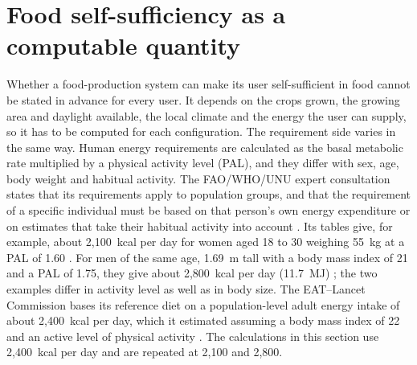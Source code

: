 \section{Food self-sufficiency as a computable quantity}\label{sec:nutrition-analysis}

Whether a food-production system can make its user self-sufficient in food cannot be stated in advance for every user. It depends on the crops grown, the growing area and daylight available, the local climate and the energy the user can supply, so it has to be computed for each configuration. The requirement side varies in the same way. Human energy requirements are calculated as the basal metabolic rate multiplied by a physical activity level (PAL), and they differ with sex, age, body weight and habitual activity. The FAO/WHO/UNU expert consultation states that its requirements apply to population groups, and that the requirement of a specific individual must be based on that person's own energy expenditure or on estimates that take their habitual activity into account \cite[Section~5.4.1, p.~40]{faowhounu2004energy}. Its tables give, for example, about 2{,}100~kcal per day for women aged 18 to 30 weighing 55~kg at a PAL of 1.60 \cite[Table~5.7, p.~44]{faowhounu2004energy}. For men of the same age, 1.69~m tall with a body mass index of 21 and a PAL of 1.75, they give about 2{,}800~kcal per day (11.7~MJ) \cite[Section~5.4.2, p.~40; Table~5.4, p.~41]{faowhounu2004energy}; the two examples differ in activity level as well as in body size. The EAT--Lancet Commission bases its reference diet on a population-level adult energy intake of about 2{,}400~kcal per day, which it estimated assuming a body mass index of 22 and an active level of physical activity \cite[p.~1633; Table~1, p.~1632]{rockstrom2025eatlancet}. The calculations in this section use 2{,}400~kcal per day and are repeated at 2{,}100 and 2{,}800.


